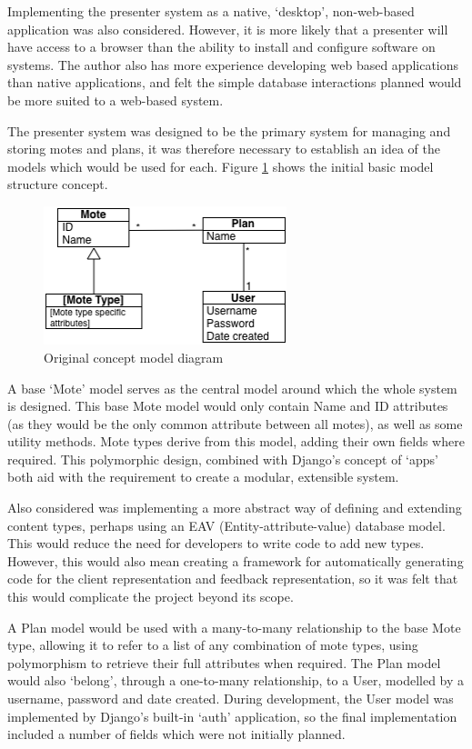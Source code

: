 \documentclass[a4papert,11pt,notitlepage]{article}
\begin{document}
Implementing the presenter system as a native, `desktop', non-web-based application was also considered. However, it is more likely that a presenter will have access to a browser than the ability to install and configure software on systems. The author also has more experience developing web based applications than native applications, and felt the simple database interactions planned would be more suited to a web-based system.

The presenter system was designed to be the primary system for managing and storing motes and plans, it was therefore necessary to establish an idea of the models which would be used for each. Figure \ref{fig:classdiagram} shows the initial basic model structure concept.

\begin{figure}[h]
\caption{Original concept model diagram}
\label{fig:classdiagram}
\centering
\includegraphics[width=200pt]{classdiagram}
\end{figure}

A base `Mote' model serves as the central model around which the whole system is designed. This base Mote model would only contain Name and ID attributes (as they would be the only common attribute between all motes), as well as some utility methods. Mote types derive from this model, adding their own fields where required. This polymorphic\cite{polymorphism:web} design, combined with Django's concept of `apps' both aid with the requirement to create a modular, extensible system.

Also considered was implementing a more abstract way of defining and extending content types, perhaps using an EAV\cite{eav:web} (Entity-attribute-value) database model. This would reduce the need for developers to write code to add new types. However, this would also mean creating a framework for automatically generating code for the client representation and feedback representation, so it was felt that this would complicate the project beyond its scope.

A Plan model would be used with a many-to-many relationship to the base Mote type, allowing it to refer to a list of any combination of mote types, using polymorphism to retrieve their full attributes when required. The Plan model would also `belong', through a one-to-many relationship, to a User, modelled by a username, password and date created. During development, the User model was implemented by Django's built-in `auth' application, so the final implementation included a number of fields which were not initially planned.
\end{document}
